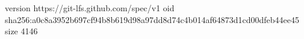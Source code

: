 version https://git-lfs.github.com/spec/v1
oid sha256:a0c8a3952b697cf94b8b619d98a97dd8d74c4b014af64873d1cd00dfeb44ee45
size 4146
